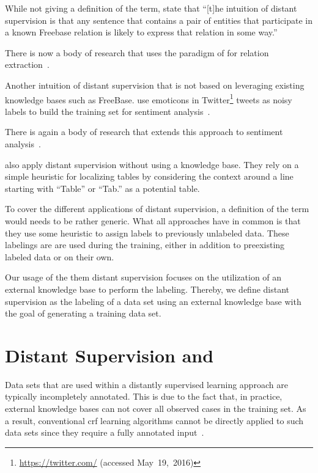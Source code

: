 While not giving a definition of the term, \citet{mintz2009distant} state that ``[t]he intuition of distant supervision is that any sentence that contains a pair of entities that participate in a known Freebase relation is likely to express that relation in some way.''

There is now a body of research that uses the paradigm of \citet{mintz2009distant} for relation extraction~\citep{benson2011event,ritter2011named,nguyen2011end,takamatsu2012reducing,xu2013filling}.

\bigskip

Another intuition of \gls{distant supervision} that is not based on leveraging existing knowledge bases such as FreeBase.
\citet{go2009twitter} use emoticons in Twitter\footnote{\url{https://twitter.com/} (accessed May~19,~2016)} tweets as noisy labels to build the training set for sentiment analysis~\citep{go2009twitter}.

There is again a body of research that extends this approach to sentiment analysis~\citep{purver2012experimenting,marchetti2012learning,suttles2013distant}.

\citet{fan2015detecting} also apply distant supervision without using a knowledge base.
They rely on a simple heuristic for localizing tables by considering the context around a line starting with ``Table'' or ``Tab.'' as a potential table.

\bigskip

To cover the different applications of \gls{distant supervision}, a definition of the term would needs to be rather generic.
What all approaches have in common is that they use some heuristic to assign labels to previously unlabeled data. These labelings are are used during the training, either in addition to preexisting labeled data or on their own.

Our usage of the them \gls{distant supervision} focuses on the utilization of an external knowledge base to perform the labeling.
Thereby, we define \gls{distant supervision} as the labeling of a data set using an external knowledge base with the goal of generating a training data set.

\section{Distant Supervision and }

Data sets that are used within a distantly supervised learning approach are typically incompletely annotated.
This is due to the fact that, in practice, external knowledge bases can not cover all observed cases in the training set.
As a result, conventional \gls{crf} learning algorithms cannot be directly applied to such data sets since they require a fully annotated input~\citep{tsuboi2008training}.

